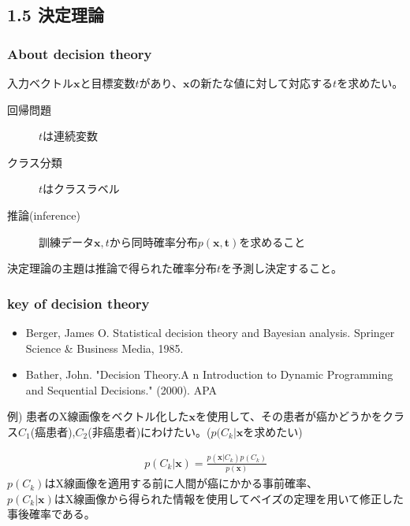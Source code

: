 \documentclass[dvipdfmx]{beamer}
\theoremstyle{definition}
\begin{document}
\subsection{1.5 決定理論}
\begin{frame}
  \frametitle{About decision theory}
  入力ベクトル$\bm{x}$と目標変数$t$があり、$\bm{x}$の新たな値に対して対応する$t$を求めたい。
  \begin{description}
    \item[回帰問題]
    $t$は連続変数
    \item[クラス分類]
    $t$はクラスラベル
    \item[推論(inference)]訓練データ${\bm{x},t}$から同時確率分布$p(\bm{x},\bm{t})$を求めること
  \end{description}
  決定理論の主題は推論で得られた確率分布$t$を予測し決定すること。
\end{frame}

\begin{frame}
  \frametitle{key of decision theory}
  \begin{itemize}
    \item Berger, James O. Statistical decision theory and Bayesian analysis. Springer Science \& Business Media, 1985.    \item Bather, John. "Decision Theory.A n Introduction to Dynamic Programming and Sequential Decisions." (2000).
    APA
  \end{itemize}
  例) 患者のX線画像をベクトル化した$\bm{x}$を使用して、その患者が癌かどうかをクラス$C_1$(癌患者),$C_2$(非癌患者)にわけたい。($p(C_k|\bm{x}$を求めたい)
  
  \begin{gather*}
    p(C_k|\bm{x}) = \frac{p(\bm{x}|C_k)p(C_k)}{p(\bm{x})}
  \end{gather*}
  $p(C_k)$はX線画像を適用する前に人間が癌にかかる事前確率、\\ $p(C_k|\bm{x})$はX線画像から得られた情報を使用してベイズの定理を用いて修正した事後確率である。
\end{frame}
\end{document}
